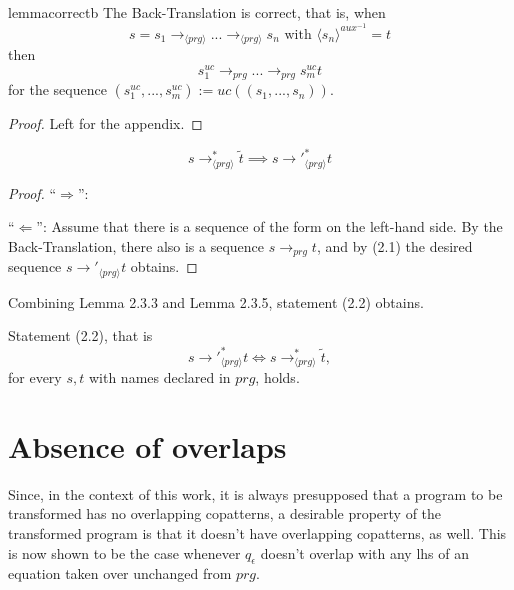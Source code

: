 \begin{restatable}{lemma}{correctb}
The Back-Translation is correct, that is, when
\[
s = s_1 {\longrightarrow}_{\langle prg \rangle} ... {\longrightarrow}_{\langle prg \rangle} s_n \text{ with } \langle s_n \rangle^{aux^{-1}} = t
\]
then
\[
s^{uc}_1 \longrightarrow_{prg} ... \longrightarrow_{prg} s^{uc}_m t
\]
for the sequence $(s^{uc}_1, ..., s^{uc}_m) := uc((s_1, ..., s_n))$.
\end{restatable}
\begin{proof}
Left for the appendix.
\end{proof}

\begin{lemma}
\[
 s \longrightarrow^*_{\langle prg \rangle} \widetilde{t} \implies s {\longrightarrow'}_{\langle prg \rangle}^* t
\]

\begin{proof}
``$\Rightarrow$'': 

``$\Leftarrow$'': Assume that there is a sequence of the form on the left-hand side. By the Back-Translation, there also is a sequence $s \longrightarrow_{prg} t$, and by (2.1) the desired sequence $s {\longrightarrow'}_{\langle prg \rangle} t$ obtains.

\end{proof}
\end{lemma}

Combining Lemma 2.3.3 and Lemma 2.3.5, statement (2.2) obtains.
\begin{proposition}
Statement (2.2), that is
\[
s {\longrightarrow'}_{\langle prg \rangle}^* t \iff s \longrightarrow^*_{\langle prg \rangle} \widetilde{t},
\]
for every $s, t$ with names declared in $prg$, holds.
\end{proposition}

\section{Absence of overlaps}

Since, in the context of this work, it is always presupposed that a program to be transformed has no overlapping copatterns, a desirable property of the transformed program is that it doesn't have overlapping copatterns, as well. This is now shown to be the case whenever $q_\epsilon$ doesn't overlap with any lhs of an equation taken over unchanged from $prg$.

